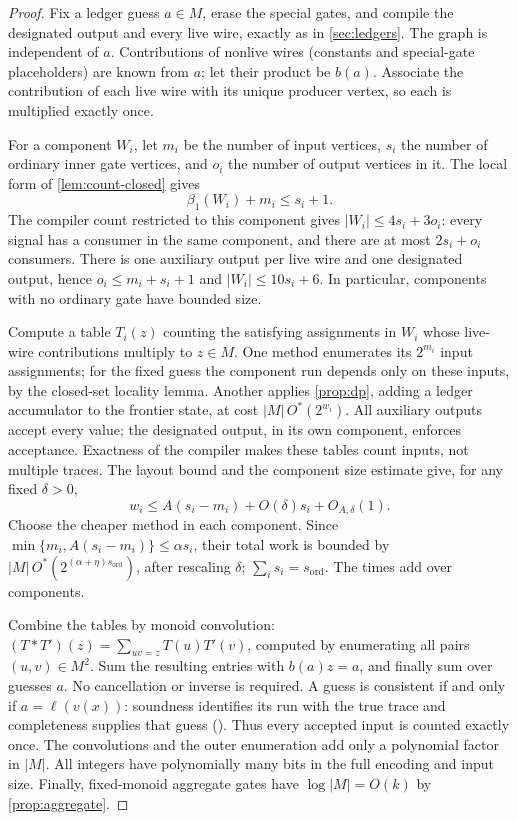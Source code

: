 \documentclass[11pt]{article}
\theoremstyle{plain}
\theoremstyle{definition}
\theoremstyle{remark}
\newcommand{\card}[1]{\lvert #1\rvert}
\begin{document}
\begin{proof}
Fix a ledger guess $a\in M$, erase the special gates, and compile the designated output
and every live wire, exactly as in \cref{sec:ledgers}. The graph is independent of $a$.
Contributions of nonlive wires (constants and special-gate placeholders) are known from $a$;
let their product be $b(a)$. Associate the contribution of each live wire with its unique
producer vertex, so each is multiplied exactly once.

For a component $W_i$, let $m_i$ be the number of input vertices, $s_i$ the number of ordinary
inner gate vertices, and $o_i$ the number of output vertices in it. The local form of
\cref{lem:count-closed} gives
\[
  \beta_1(W_i)+m_i\le s_i+1.
\]
The compiler count restricted to this component gives $|W_i|\le4s_i+3o_i$: every signal has a
consumer in the same component, and there are at most $2s_i+o_i$ consumers. There is one
auxiliary output per live wire and one designated output, hence $o_i\le m_i+s_i+1$ and
$|W_i|\le10s_i+6$. In particular, components with no ordinary gate have bounded size.

Compute a table $T_i(z)$ counting the satisfying assignments in $W_i$ whose live-wire
contributions multiply to $z\in M$. One method enumerates its $2^{m_i}$ input assignments;
for the fixed guess the component run depends only on these inputs, by the closed-set
locality lemma. Another applies \cref{prop:dp}, adding a ledger accumulator to the frontier
state, at cost $\card M\,O^*(2^{w_i})$. All auxiliary outputs accept every value; the
designated output, in its own component, enforces acceptance. Exactness of the compiler
makes these tables count inputs, not multiple traces. The layout bound and the component
size estimate give, for any fixed $\delta>0$,
\[
  w_i\le A(s_i-m_i)+O(\delta)s_i+O_{A,\delta}(1).
\]
Choose the cheaper method in each component. Since
$\min\{m_i,A(s_i-m_i)\}\le\alpha s_i$, their total work is bounded by
$\card M\,O^*(2^{(\alpha+\eta)s_{\mathrm{ord}}})$, after rescaling $\delta$;
$\sum_i s_i=s_{\mathrm{ord}}$. The times add over components.

Combine the tables by monoid convolution:
$(T*T')(z)=\sum_{uv=z}T(u)T'(v)$, computed by enumerating all pairs $(u,v)\in M^2$.
Sum the resulting entries with $b(a)z=a$, and finally sum over guesses $a$.
No cancellation or inverse is required. A guess is consistent if and only if
$a=\ell(v(x))$: soundness identifies its run with the true trace and completeness supplies
that guess (). Thus every accepted input is counted
exactly once. The convolutions and the outer enumeration add only a polynomial factor in
$\card M$. All integers have polynomially many bits in the full encoding and input size.
Finally, fixed-monoid aggregate gates have $\log\card M=O(k)$ by \cref{prop:aggregate}.
\end{proof}
\end{document}
